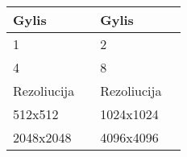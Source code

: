 
\begin{table}[h!]
\centering

\begin{tabular}{| l | l | l | l |}
\hline
Gylis &  & Gylis &  \\
\hline
1 &  & 2 &  \\
\hline
4 &  & 8 &  \\
\hline
Rezoliucija &  & Rezoliucija &  \\
\hline
512x512 &  & 1024x1024 &  \\
\hline
2048x2048 &  & 4096x4096 &  \\
\hline

\end{tabular}

\end{table}